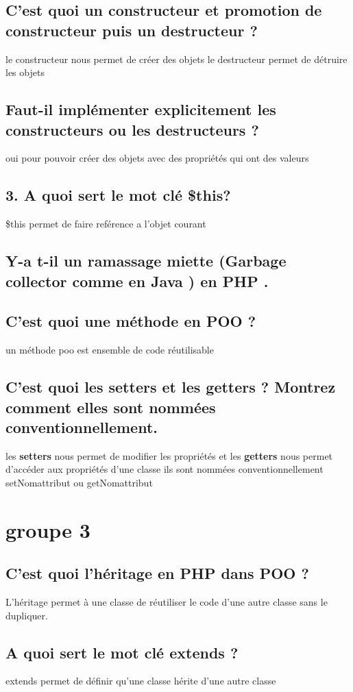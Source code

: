 \documentclass[12pt,b5paper]{article}
\begin{document}
\subsection{C’est quoi un constructeur et promotion de constructeur puis un destructeur ?}
le constructeur nous permet de créer des objets
le destructeur permet de détruire les objets

\subsection {Faut-il implémenter explicitement les constructeurs ou les destructeurs ?}
oui pour pouvoir créer des objets avec des propriétés qui ont des valeurs
\subsection{3. A quoi sert le mot clé \$this?}
\$this permet de faire reférence a l'objet courant

\subsection{ Y-a t-il un ramassage miette (Garbage collector comme en Java ) en PHP .}
\subsection{ C’est quoi une méthode en POO ?}
un méthode poo est ensemble de code réutilisable

\subsection{ C’est quoi les setters et les getters ? Montrez comment elles sont nommées conventionnellement.}
les \textbf{setters} nous permet de modifier les propriétés et les
\textbf{getters} nous permet d’accéder aux propriétés d'une classe
ils sont nommées conventionnellement setNomattribut ou getNomattribut
\section{groupe 3}
\subsection{ C’est quoi l’héritage en PHP dans POO ?}
 L'héritage permet à une classe de réutiliser le code d'une autre classe sans le dupliquer.
\subsection{A quoi sert le mot clé extends ?}
extends permet de définir qu'une classe hérite d'une autre classe
\end{document}
